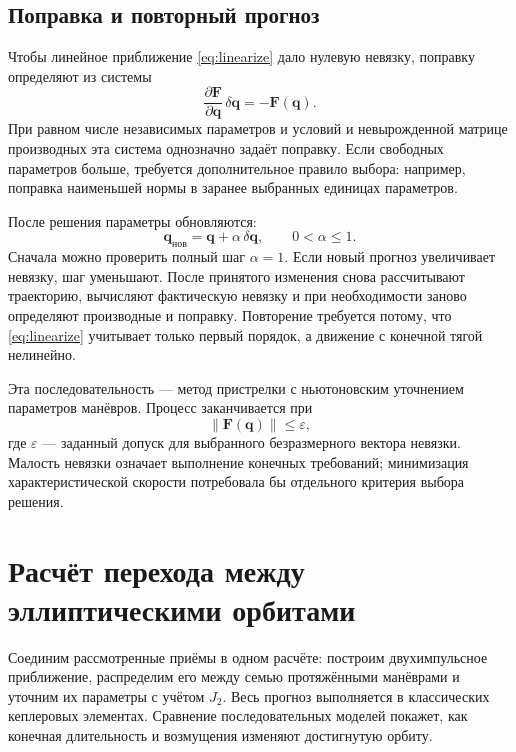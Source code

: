 \documentclass[a4paper,11pt]{article}
\newcommand{\vect}[1]{\boldsymbol{#1}}
\newcommand{\norm}[1]{\left\lVert#1\right\rVert}
\numberwithin{equation}{section}
\begin{document}
\subsection{Поправка и повторный прогноз}

Чтобы линейное приближение \eqref{eq:linearize} дало нулевую
невязку, поправку определяют из системы
\begin{equation}
\frac{\partial\vect F}{\partial\vect q}\,\delta\vect q
=-\vect F(\vect q).
\label{eq:newton-correction}
\end{equation}
При равном числе независимых параметров и условий
и невырожденной матрице производных эта система однозначно
задаёт поправку. Если свободных параметров больше, требуется
дополнительное правило выбора: например, поправка наименьшей нормы
в заранее выбранных единицах параметров.

После решения параметры обновляются:
\begin{equation}
\vect q_{\text{нов}}=\vect q+\alpha\,\delta\vect q,
\qquad 0<\alpha\leqslant1.
\label{eq:update}
\end{equation}
Сначала можно проверить полный шаг $\alpha=1$.
Если новый прогноз увеличивает невязку, шаг уменьшают.
После принятого изменения снова рассчитывают траекторию,
вычисляют фактическую невязку и при необходимости заново
определяют производные и поправку. Повторение требуется потому,
что \eqref{eq:linearize} учитывает только первый порядок,
а движение с конечной тягой нелинейно.

Эта последовательность --- метод пристрелки с ньютоновским
уточнением параметров манёвров. Процесс заканчивается при
\begin{equation}
\norm{\vect F(\vect q)}\leqslant\varepsilon,
\label{eq:targeting-stop}
\end{equation}
где $\varepsilon$ --- заданный допуск для выбранного
безразмерного вектора невязки. Малость невязки означает
выполнение конечных требований; минимизация характеристической
скорости потребовала бы отдельного критерия выбора решения.
\FloatBarrier
\section{Расчёт перехода между эллиптическими орбитами}
\label{sec:example}

Соединим рассмотренные приёмы в одном расчёте: построим
двухимпульсное приближение, распределим его между семью
протяжёнными манёврами и уточним их параметры с учётом $J_2$.
Весь прогноз выполняется в классических кеплеровых элементах.
Сравнение последовательных моделей покажет, как конечная длительность
и возмущения изменяют достигнутую орбиту.
\end{document}
